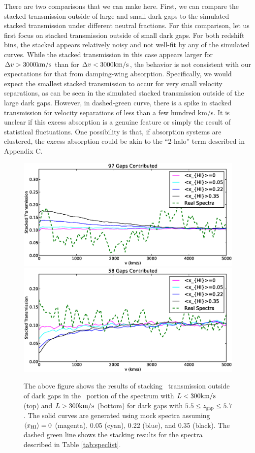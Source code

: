 There are two comparisons that we can make here. First, we can compare the stacked transmission outside of large and small dark gaps to the simulated stacked transmission under different neutral fractions. For this comparison, let us first focus on stacked transmission outside of small dark gaps. For both redshift bins, the stacked appears relatively noisy and not well-fit by any of the simulated curves. While the stacked transmission in this case appears larger for $\Delta v > 3000\text{km}/\text{s}$ than for $\Delta v < 3000\text{km}/\text{s}$, the behavior is not consistent with our expectations for that from damping-wing absorption. Specifically, we would expect the smallest stacked transmission to occur for very small velocity separations, as can be seen in the simulated stacked transmission outside of the large dark gaps. However, in dashed-green curve, there is a spike in stacked transmission for velocity separations of less than a few hundred km/s. It is unclear if this excess absorption is a genuine feature or simply the result of statistical fluctuations. One possibility is that, if absorption systems are clustered, the excess absorption could be akin to the ``2-halo'' term described in Appendix C. 


\begin{figure}[!ht]
  \centering
  \includegraphics[width=12cm]{smallstack_lowz_mesinger.eps}
  \includegraphics[width=12cm]{largestack_lowz_mesinger.eps}
  \caption{The above figure shows the results of stacking \lya\ transmission outside of dark gaps in the \lyb\ portion of the spectrum with $L < 300\text{km}/\text{s}$ (top) and $L > 300\text{km}/\text{s}$ (bottom) for dark gaps with $5.5 \leq z_{\text{gap}} \leq 5.7$. The solid curves are generated using mock spectra assuming $\langle x_{\text{HI}}\rangle = 0$ (magenta), 0.05 (cyan), 0.22 (blue), and 0.35 (black). The dashed green line shows the stacking results for the spectra described in Table \ref{tab:speclist}.}
  \label{fig:LargePreliminaryLowZ}
\end{figure}

